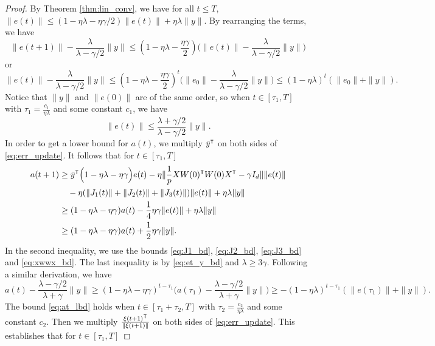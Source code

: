 \begin{proof}
By Theorem \ref{thm:lin_conv}, we have for all $t\leq T$, $\|e(t)\|\leq(1-\eta\lambda-\eta\gamma/2)\|e(t)\|+\eta\lambda\|y\|$. By rearranging the terms, we have
\begin{equation*}
    \|e(t+1)\| -\frac{\lambda }{\lambda - \gamma/2}\|y\| \leq (1-\eta\lambda-\frac{\eta\gamma}{2})\Big(\|e(t)\| -\frac{\lambda }{\lambda - \gamma/2}\|y\|\Big)
\end{equation*}
or
\begin{equation*}
\|e(t)\| -\frac{\lambda }{\lambda - \gamma/2}\|y\|\leq (1-\eta\lambda-\frac{\eta\gamma}{2})^t \Big(\|e_0\|- \frac{\lambda }{\lambda - \gamma/2}\|y\|\Big) \leq (1-\eta\lambda)^t(\|e_0\|+\|y\|).
\end{equation*}
Notice that $\|y\|$ and $\|e(0)\|$ are of the same order, so when $t\in [\tau_1,T]$ with $\tau_1 = \frac{c_1}{\eta\lambda}$ and some constant $c_1$, we have
\begin{equation}
\label{eq:et_y_bd}
\|e(t)\|\leq \frac{\lambda+\gamma/2}{\lambda-\gamma/2} \|y\|.
\end{equation}
In order to get a lower bound for $a(t)$, we multiply $\bar{y}\transpose$ on both sides of \eqref{eq:err_update}. It follows that for $t\in [\tau_1,T]$
\begin{equation*}
\begin{aligned}
a(t+1)
&\geq \bar{y}\transpose\Big(1-\eta\lambda-\eta\gamma\Big)e(t) - \eta\|\frac{1}{p}XW(0)\transpose W(0)X\transpose-\gamma I_d\|\|e(t)\|\\
&\quad-\eta(\|J_1(t)\|+\|J_2(t)\|+\|J_3(t)\|)\|e(t)\| +\eta\lambda\|y\|  \\
&\geq (1-\eta\lambda-\eta\gamma)a(t)- \frac{1}{4}\eta\gamma \|e(t)\| +\eta\lambda\|y\| \\
&\geq (1-\eta\lambda-\eta\gamma)a(t)+\frac{1}{2}\eta\gamma\|y\|.
\end{aligned}
\end{equation*}
In the second inequality, we use the bounds \eqref{eq:J1_bd}, \eqref{eq:J2_bd}, \eqref{eq:J3_bd} and \eqref{eq:xwwx_bd}. The last inequality is by \eqref{eq:et_y_bd} and $\lambda\geq 3\gamma$. Following a similar derivation, we have
\begin{equation*}
a(t) -\frac{\lambda - \gamma/2}{\lambda +\gamma}\|y\|\geq (1-\eta\lambda-\eta\gamma)^{t-\tau_1} \Big(a(\tau_1)- \frac{\lambda - \gamma/2}{\lambda +\gamma}\|y\|\Big) \geq -(1-\eta\lambda)^{t-\tau_1}(\|e(\tau_1)\|+\|y\|).
\end{equation*}
The bound \eqref{eq:at_lbd} holds when $t\in [\tau_1+\tau_2,T]$ with $\tau_2 = \frac{c_2}{\eta\lambda}$ and some constant $c_2$. Then we multiply $\frac{\xi(t+1)\transpose}{\|\xi(t+1)\|}$ on both sides of \eqref{eq:err_update}. This establishes that for $t\in [\tau_1,T]$

\end{proof}

